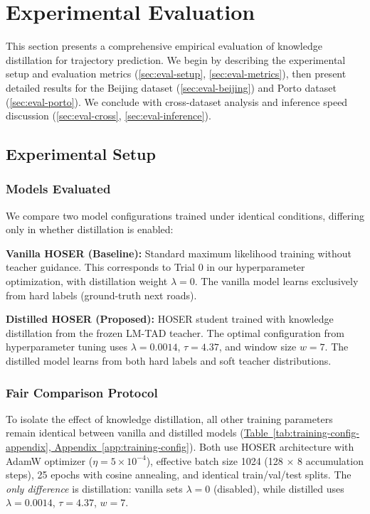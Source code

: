 
\section{Experimental Evaluation}
\label{sec:evaluation}

This section presents a comprehensive empirical evaluation of knowledge distillation for trajectory prediction. We begin by describing the experimental setup and evaluation metrics (\autoref{sec:eval-setup}, \autoref{sec:eval-metrics}), then present detailed results for the Beijing dataset (\autoref{sec:eval-beijing}) and Porto dataset (\autoref{sec:eval-porto}). We conclude with cross-dataset analysis and inference speed discussion (\autoref{sec:eval-cross}, \autoref{sec:eval-inference}).

\subsection{Experimental Setup}
\label{sec:eval-setup}

\subsubsection{Models Evaluated}

We compare two model configurations trained under identical conditions, differing only in whether distillation is enabled:

\textbf{Vanilla HOSER (Baseline):} Standard maximum likelihood training without teacher guidance. This corresponds to Trial 0 in our hyperparameter optimization, with distillation weight $\lambda = 0$. The vanilla model learns exclusively from hard labels (ground-truth next roads).

\textbf{Distilled HOSER (Proposed):} HOSER student trained with knowledge distillation from the frozen LM-TAD teacher. The optimal configuration from hyperparameter tuning uses $\lambda = 0.0014$, $\tau = 4.37$, and window size $w = 7$. The distilled model learns from both hard labels and soft teacher distributions.

\subsubsection{Fair Comparison Protocol}

To isolate the effect of knowledge distillation, all other training parameters remain identical between vanilla and distilled models (\hyperref[app:training-config]{Table~\ref*{tab:training-config-appendix}, Appendix~\ref*{app:training-config}}). Both use HOSER architecture with AdamW optimizer ($\eta = 5 \times 10^{-4}$), effective batch size 1024 (128 $\times$ 8 accumulation steps), 25 epochs with cosine annealing, and identical train/val/test splits. The \emph{only difference} is distillation: vanilla sets $\lambda = 0$ (disabled), while distilled uses $\lambda = 0.0014$, $\tau = 4.37$, $w = 7$.

